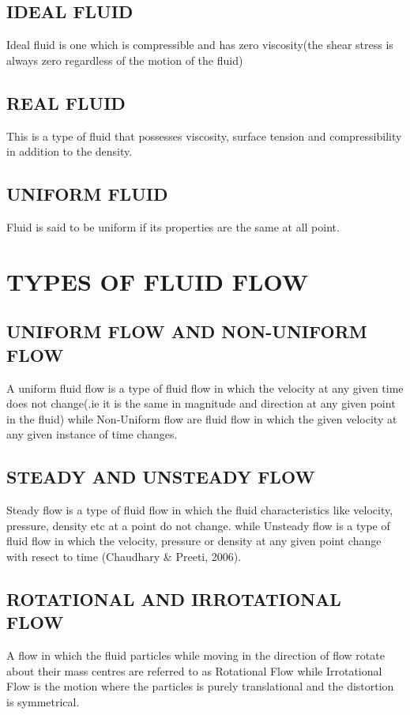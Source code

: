 \documentclass[11pt]{report}
\begin{document}
	\subsection{IDEAL FLUID}
	Ideal fluid is one which is compressible and has zero viscosity(the shear stress is always zero regardless of the motion of the fluid)
	
	\subsection{REAL FLUID}
	This is a type of fluid that possesses viscosity, surface tension and compressibility in addition to the density.
	
	\subsection{UNIFORM FLUID}
	Fluid is said to be uniform if its properties are the same at all point.
	
	
	\section{TYPES OF FLUID FLOW}
	
	\subsection{UNIFORM FLOW AND NON-UNIFORM FLOW}
	A uniform fluid flow is a type of fluid flow in which the velocity at any given time does not change(.ie it is the same in magnitude and direction at any given point in the fluid) while Non-Uniform flow are fluid flow in which the given velocity at any given instance of time changes.
	
	\subsection{STEADY AND UNSTEADY FLOW}
	Steady flow is a type of fluid flow in which the fluid characteristics like velocity, pressure, density etc at a point do not change. while Unsteady flow is a type of fluid flow in which the velocity, pressure or density at any given point change with resect to time (Chaudhary \& Preeti, 2006).
	
	\subsection{ROTATIONAL AND IRROTATIONAL FLOW}
	A flow in which the fluid particles while moving in the direction of flow rotate about their mass centres are referred to as Rotational Flow while Irrotational Flow is the motion where the particles is purely translational and the distortion is symmetrical.
	
\end{document}
